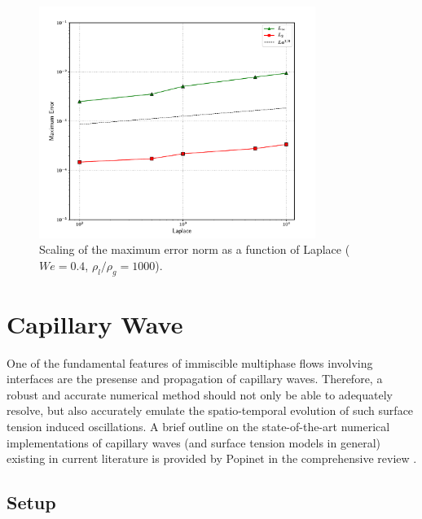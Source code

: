 \begin{figure}
    \centering
    \includegraphics[width = 0.8\textwidth]{plots/droplet_advect/laplaces.pdf}
\caption{ Scaling of the maximum error norm as a function of Laplace ($We = 0.4$, $\rho_l / \rho_g = 1000$). }
    \label{lap}
\end{figure}




\section{Capillary Wave}
One of the fundamental features of immiscible multiphase flows involving interfaces are the presense and propagation of capillary waves. Therefore, a robust and accurate numerical method should not only be able to adequately resolve, but also accurately emulate the spatio-temporal evolution of such surface tension induced oscillations. A brief outline on the state-of-the-art numerical implementations of capillary waves (and surface tension models in general) existing in current literature is provided by Popinet in the comprehensive review .

\subsection*{Setup}

